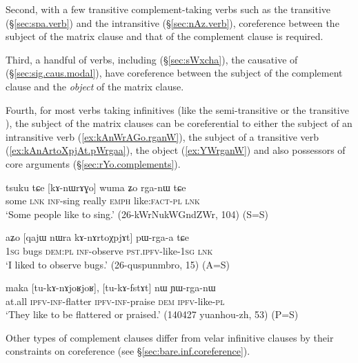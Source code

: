 Second, with a few transitive complement-taking verbs such as the transitive  (§\ref{sec:spa.verb}) and the intransitive  (§\ref{sec:nAz.verb}), coreference between the subject of the matrix clause and that of the complement clause is required. 

Third, a handful of verbs, including  (§\ref{sec:sWxcha}), the causative of  (§\ref{sec:sig.caus.modal}), have coreference between the subject of the complement clause and the \textit{object} of the matrix clause.

Fourth, for most verbs taking infinitives (like the semi-transitive  or the transitive ),  the subject of the matrix clauses can be coreferential to either the subject of an intransitive verb (\ref{ex:kAnWrAGo.rganW}), the subject of a transitive verb (\ref{ex:kAnArtoXpjAt.pWrgaa}), the object (\ref{ex:YWrganW}) and also possessors of core arguments (§\ref{sec:rYo.complements}).

\begin{exe}
   \ex   \label{ex:kAnWrAGo.rganW} 
\gll tsuku tɕe [kɤ-nɯrɤɣo] wuma ʑo rga-nɯ tɕe \\
some \textsc{lnk} \textsc{inf}-sing really \textsc{emph} like:\textsc{fact}-\textsc{pl}  \textsc{lnk} \\
\glt `Some people like to sing.' (26-kWrNukWGndZWr, 104)  (S=S)
\end{exe}  
 
\begin{exe}
\ex   \label{ex:kAnArtoXpjAt.pWrgaa} 
\gll aʑo [qajɯ nɯra kɤ-nɤrtoχpjɤt] pɯ-rga-a tɕe  	\\
  	\textsc{1sg} bugs \textsc{dem}:\textsc{pl} \textsc{inf}-observe \textsc{pst}.\textsc{ipfv}-like-\textsc{1sg} \textsc{lnk}  \\
 \glt `I liked to observe bugs.' (26-quspunmbro, 15) (A=S)
\end{exe}  
 
\begin{exe}
   \ex   \label{ex:YWrganW} 
\gll maka [tu-kɤ-nɤjoʁjoʁ], [tu-kɤ-fstɤt] nɯ ɲɯ-rga-nɯ  \\
at.all \textsc{ipfv}-\textsc{inf}-flatter \textsc{ipfv}-\textsc{inf}-praise \textsc{dem} \textsc{ipfv}-like-\textsc{pl} \\
\glt `They like to be flattered or praised.' (140427 yuanhou-zh, 53) (P=S)
\end{exe}  


Other types of complement clauses differ from velar infinitive clauses by their constraints on coreference (see §\ref{sec:bare.inf.coreference}).

